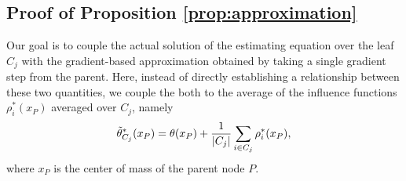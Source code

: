 \documentclass[aos]{imsart}
\theoremstyle{plain}
\theoremstyle{definition}
\theoremstyle{remark}
\begin{document}
\begin{CJK}{UTF8}{gbsn}
{\begin{appendix}
\subsection*{Proof of Proposition \ref{prop:approximation}}

Our goal is to couple the actual solution  of the estimating equation
over the leaf $C_j$ with the gradient-based approximation  obtained
by taking a single gradient step from the parent. Here, instead of directly establishing
a relationship between these two quantities, we couple the both to the average of the
influence functions $\rho_i^*(x_P)$ averaged over $C_j$, namely
\begin{equation}
\label{eq:influence_child}
\ttheta_{C_j}^*(x_P) = \theta(x_P) + \frac{1}{\abs{C_j}} \sum_{i \in C_j} \rho_i^*(x_P),
\end{equation}
where $x_P$ is the center of mass of the parent node $P$.


\end{appendix}}
\end{CJK}
\end{document}
